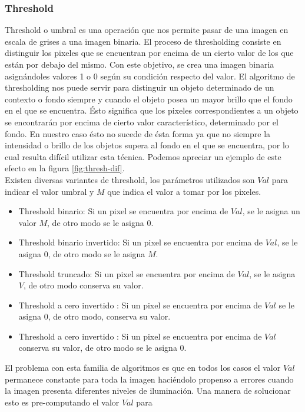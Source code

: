 	\subsubsection{\label{sec:thresh} Threshold}
Threshold o umbral es una operación que nos permite pasar de una 
imagen en escala de grises a una imagen binaria. El proceso de 
thresholding consiste en distinguir los pixeles que se encuentran por 
encima de un cierto valor de los que están por debajo del mismo. Con 
este objetivo, se crea una imagen binaria asignándoles valores 1 o 0 
según su condición respecto del valor. El algoritmo de thresholding 
nos puede servir para distinguir un objeto determinado de un contexto o 
fondo siempre y cuando el objeto posea un mayor brillo que el fondo en 
el que se encuentra. Ésto significa que los pixeles correspondientes a 
un objeto se encontrarán por encima de cierto valor característico, 
determinado por el fondo. En nuestro caso ésto no sucede de ésta forma ya que no siempre la intensidad o brillo de los objetos supera al fondo en el que se encuentra, por lo cual resulta difícil utilizar esta técnica. Podemos apreciar un ejemplo de este efecto en la figura \ref{fig:thresh-dif}. \\
\indent Existen diversas variantes de threshold, los parámetros 
utilizados son $Val$ para indicar el valor umbral y $M$ que indica el 
valor a tomar por los pixeles.
\begin{itemize}
\item{ Threshold binario:  Si un pixel se encuentra por encima de $Val$, se le asigna un valor $M$, de otro modo se le asigna $0$.}
\item{ Threshold binario invertido:  Si un pixel se encuentra por encima de $Val$, se le asigna 0, de otro modo se le asigna $M$.}
\item{ Threshold truncado:  Si un pixel se encuentra por encima de $Val$, se le asigna $V$, de otro modo conserva su valor.}
\item{ Threshold a cero invertido : Si un pixel se encuentra por encima de $Val$ se le asigna $0$, de otro modo, conserva su valor.}
\item{ Threshold a cero invertido : Si un pixel se encuentra por encima de $Val$ conserva su valor, de otro modo se le asigna $0$.}
\end{itemize}
El problema con esta familia de algoritmos es que en todos los casos el 
valor $Val$ permanece constante para toda la imagen haciéndolo propenso 
a errores cuando la imagen presenta diferentes niveles de iluminación. 
Una manera de solucionar esto es pre-computando el valor $Val$ para 
